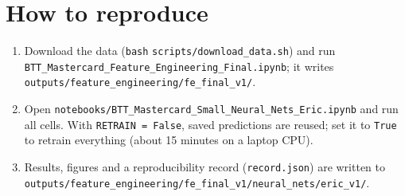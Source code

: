 \documentclass[11pt]{article}
\begin{document}
\section*{How to reproduce}
\begin{enumerate}
\item Download the data (\texttt{bash} \nolinkurl{scripts/download_data.sh}) and run \nolinkurl{BTT_Mastercard_Feature_Engineering_Final.ipynb}; it writes \nolinkurl{outputs/feature_engineering/fe_final_v1/}.
\item Open \nolinkurl{notebooks/BTT_Mastercard_Small_Neural_Nets_Eric.ipynb} and run all cells. With \texttt{RETRAIN = False}, saved predictions are reused; set it to \texttt{True} to retrain everything (about 15 minutes on a laptop CPU).
\item Results, figures and a reproducibility record (\texttt{record.json}) are written to \nolinkurl{outputs/feature_engineering/fe_final_v1/neural_nets/eric_v1/}.
\end{enumerate}
\end{document}
